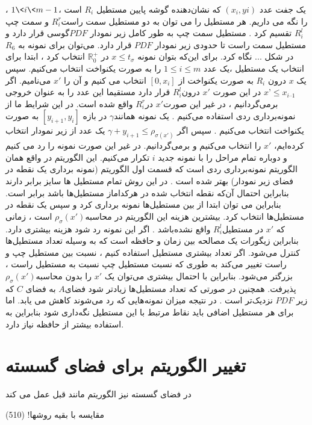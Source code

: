 یک جفت عدد $(x_{i},y{i})$ که نشان‌دهنده گوشه پایین مستطیل $R_{i}$ است ،$1\< i \< m - 1$ ، را نگه می داریم. 
هر مستطیل را می توان به دو مستطیل  سمت راست$ R^{r}_{i}$ و  سمت چپ$ R^{l}_{i}$ تقسیم کرد . مستطیل سمت چپ به طور کامل زیر نمودار $PDF$گوسی قرار دارد و مستطیل سمت راست تا حدودی زیر نمودار $PDF$  قرار دارد. می‌توان برای نمونه به $R_{6}$  در شکل ... نگاه کرد.
برای این‌که بتوان نمونه $x \leq t_{\sigma}$  در $\mathbb{R}^{+}_{0}$  انتخاب کرد ، ابتدا برای انتخاب یک مستطیل ،یک عدد $1 \leq i \leq m$ را به صورت یکنواخت انتخاب می‌کنیم.  سپس یک $ x$  درون $R_{i}$ به صورت یکنواخت  از  $[0, x_{i}]$ انتخاب می کنیم  و آن را $x'$  می‌نامیم. اگر$ x’\leq   x_{i – 1}$   در این صورت  $x'$   درون$ R^{l}_{i}$ قرار دارد مستقیما این عدد را به عنوان خروجی برمی‌گردانیم ، در غیر این صورت$x'$  در$ R^{r}_{i}$ واقع شده است. در این شرایط ما از نمونه‌برداری ردی استفاده می‌کنیم . یک نمونه همانند$\gamma$  در بازه $ [y_{i+1}, y_{i}]$ به صورت یکنواخت انتخاب می‌کنیم . سپس اگر $\gamma + y_{i+1}\leq \rho _{\sigma (x')}$ یک عدد از زیر نمودار انتخاب کرده‌ایم،   $x'$ را انتخاب می‌کنیم و برمی‌گردانیم. در غیر این صورت نمونه را رد می کنیم و دوباره تمام مراحل را  با نمونه‌ جدید $i$  تکرار می‌کنیم.
این الگوریتم در واقع همان الگوریتم نمونه‌برداری ردی است که قسمت اول الگوریتم (نمونه برداری یک نقطه در فضای زیر نمودار) بهتر شده است . در این روش تمام مستطیل ها سایز برابر دارند بنابراین احتمال آن‌که نقطه انتخاب شده در هرکداماز  مستطیل‌ها باشد برابر است. بنابراین می توان ابتدا از بین مستطیل‌ها نمونه برداری کرد و سپس یک نقطه در مستطیل‌ها انتخاب کرد.
بیشترین هزینه این الگوریتم‌ در محاسبه$\rho_{\sigma}(x')$  است ، زمانی که  $x'$ در مستطیل$ R^{l}_{i}$ واقع نشده‌باشد .  اگر این نمونه رد شود هزینه بیشتری دارد. بنابراین زیگورات یک مصالحه بین زمان و حافظه است که به وسیله تعداد مستطیل‌ها کنترل می‌شود. اگر تعداد بیشتری مستطیل استفاده کنیم ، نسبت بین مستطیل  چپ و راست تغییر می‌کند به طوری که نسبت مستطیل چپ نسبت به مستطیل راست ، بزرگتر می‌شود. بنابراین با احتمال بیشتری می‌توان  یک $x'$ را بدون محاسبه$\rho_{\sigma}(x')$    پذیرفت.  همچنین در صورتی که تعداد مستطیل‌ها زیادتر شود فضای$ A$  به فضای $C$   که زیر $PDF$ نزدیک‌تر است . در نتیجه میزان نمونه‌‌هایی که رد می‌شوند کاهش می یابد. اما برای هر مستطیل اضافی باید نقاط مرتبط با این مستطیل نگه‌داری شود بنابراین به استفاده بیشتر از حافظه نیاز دارد.
\section{تغییر الگوریتم برای فضای گسسته}
در فضای گسسته نیز الگوریتم مانند قبل عمل می کند 

مقایسه با بقیه روشها! (510)

